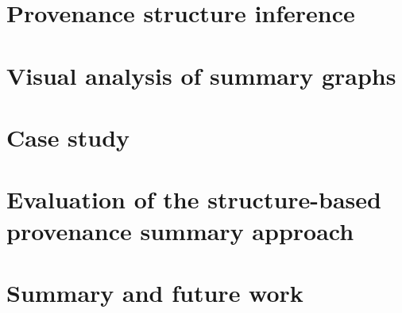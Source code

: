 \section{Provenance structure inference}
\label{sec:system}


\section{Visual analysis of summary graphs}
\label{sec:vis}


\section{Case study}
\label{sec:casestudy}


\section{Evaluation of the structure-based provenance summary approach}
\label{sec:evaluation}



\section{Summary and future work}




